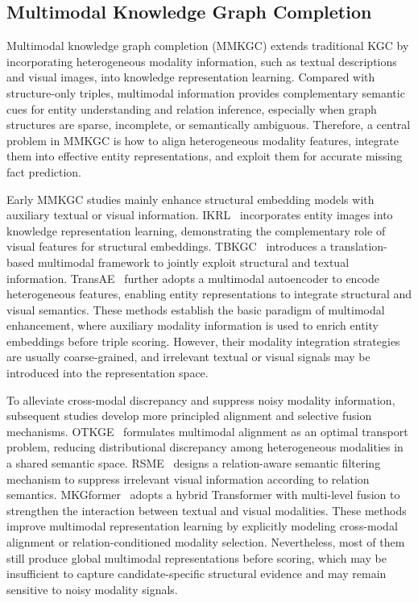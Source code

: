 \documentclass[pdflatex,sn-mathphys-num]{sn-jnl}
\begin{document}
\subsection{Multimodal Knowledge Graph Completion}

Multimodal knowledge graph completion (MMKGC) extends traditional KGC by incorporating heterogeneous modality information, such as textual descriptions and visual images, into knowledge representation learning. Compared with structure-only triples, multimodal information provides complementary semantic cues for entity understanding and relation inference, especially when graph structures are sparse, incomplete, or semantically ambiguous. Therefore, a central problem in MMKGC is how to align heterogeneous modality features, integrate them into effective entity representations, and exploit them for accurate missing fact prediction.

Early MMKGC studies mainly enhance structural embedding models with auxiliary textual or visual information. IKRL~\cite{xie2017ikrl} incorporates entity images into knowledge representation learning, demonstrating the complementary role of visual features for structural embeddings. TBKGC~\cite{mousselly2018tbkgc} introduces a translation-based multimodal framework to jointly exploit structural and textual information. TransAE~\cite{wang2019transae} further adopts a multimodal autoencoder to encode heterogeneous features, enabling entity representations to integrate structural and visual semantics. These methods establish the basic paradigm of multimodal enhancement, where auxiliary modality information is used to enrich entity embeddings before triple scoring. However, their modality integration strategies are usually coarse-grained, and irrelevant textual or visual signals may be introduced into the representation space.

To alleviate cross-modal discrepancy and suppress noisy modality information, subsequent studies develop more principled alignment and selective fusion mechanisms. OTKGE~\cite{cao2022otkge} formulates multimodal alignment as an optimal transport problem, reducing distributional discrepancy among heterogeneous modalities in a shared semantic space. RSME~\cite{wang2021rsme} designs a relation-aware semantic filtering mechanism to suppress irrelevant visual information according to relation semantics. MKGformer~\cite{chen2022mkgformer} adopts a hybrid Transformer with multi-level fusion to strengthen the interaction between textual and visual modalities. These methods improve multimodal representation learning by explicitly modeling cross-modal alignment or relation-conditioned modality selection. Nevertheless, most of them still produce global multimodal representations before scoring, which may be insufficient to capture candidate-specific structural evidence and may remain sensitive to noisy modality signals.
\end{document}
